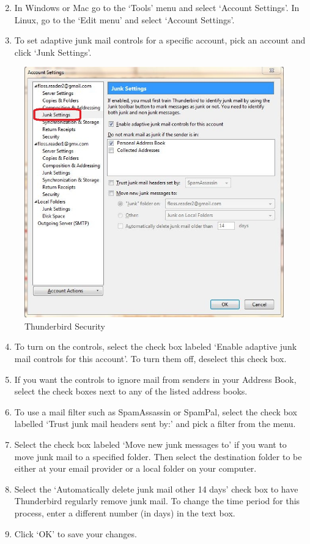 \begin{enumerate}[1.]
\setcounter{enumi}{1}
\item
  In Windows or Mac go to the `Tools' menu and select `Account
  Settings'. In Linux, go to the `Edit menu' and select `Account
  Settings'.
\item
  To set adaptive junk mail controls for a specific account, pick an
  account and click `Junk Settings'.
\end{enumerate}
\begin{figure}[htbp]
\centering
\includegraphics{thunderbird_sec_9.jpg}
\caption{Thunderbird Security}
\end{figure}

\begin{enumerate}[1.]
\setcounter{enumi}{3}
\item
  To turn on the controls, select the check box labeled `Enable adaptive
  junk mail controls for this account'. To turn them off, deselect this
  check box.
\item
  If you want the controls to ignore mail from senders in your Address
  Book, select the check boxes next to any of the listed address books.
\item
  To use a mail filter such as SpamAssassin or SpamPal, select the check
  box labelled `Trust junk mail headers sent by:' and pick a filter from
  the menu.
\item
  Select the check box labeled `Move new junk messages to' if you want
  to move junk mail to a specified folder. Then select the destination
  folder to be either at your email provider or a local folder on your
  computer.
\item
  Select the `Automatically delete junk mail other 14 days' check box to
  have Thunderbird regularly remove junk mail. To change the time period
  for this process, enter a different number (in days) in the text box.
\item
  Click `OK' to save your changes.
\end{enumerate}
